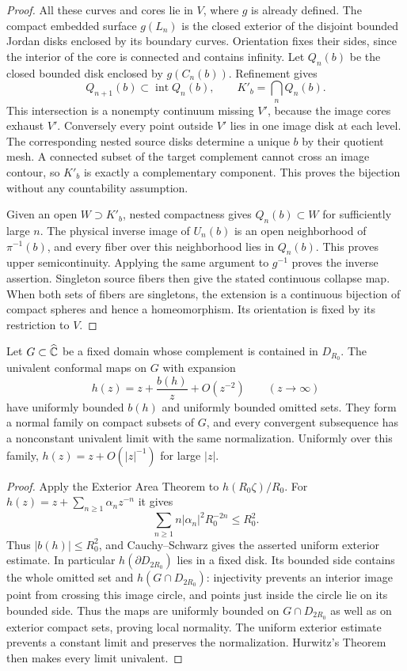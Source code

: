 \begin{proof}
All these curves and cores lie in $V$, where $g$ is already defined.
The compact embedded surface $g(L_n)$ is the closed exterior of the
disjoint bounded Jordan disks enclosed by its boundary curves.
Orientation fixes their sides, since the interior of the core is
connected and contains infinity.  Let $Q_n(b)$ be the closed bounded
disk enclosed by $g(C_n(b))$.  Refinement gives
\[
 Q_{n+1}(b)\subset\operatorname{int}Q_n(b),\qquad
 K'_b=\bigcap_nQ_n(b).
\]
This intersection is a nonempty continuum missing $V'$, because the
image cores exhaust $V'$.  Conversely every point outside $V'$ lies
in one image disk at each level.  The corresponding nested source
disks determine a unique $b$ by their quotient mesh.  A connected
subset of the target complement cannot cross an image contour, so
$K'_b$ is exactly a complementary component.  This proves the
bijection without any countability assumption.

Given an open $W\supset K'_b$, nested compactness gives
$Q_n(b)\subset W$ for sufficiently large $n$.  The physical inverse
image of $U_n(b)$ is an open neighborhood of $\pi^{-1}(b)$, and every
fiber over this neighborhood lies in $Q_n(b)$.  This proves upper
semicontinuity.  Applying the same argument to $g^{-1}$ proves the
inverse assertion.  Singleton source fibers then give the stated
continuous collapse map.  When both sets of fibers are singletons,
the extension is a continuous bijection of compact spheres and hence
a homeomorphism.  Its orientation is fixed by its restriction to $V$.
\end{proof}

\begin{lemma}\label{lem:normalization}
Let $G\subset\widehat{\mathbb C}$ be a fixed domain whose complement is contained
in $D_{R_0}$.  The univalent conformal maps on $G$ with expansion
\[
 h(z)=z+\frac{b(h)}z+O(z^{-2})\qquad(z\to\infty)
\]
have uniformly bounded $b(h)$ and uniformly bounded omitted sets.
They form a normal family on compact subsets of $G$, and every
convergent subsequence has a nonconstant univalent limit with the
same normalization.  Uniformly over this family,
$h(z)=z+O(|z|^{-1})$ for large $|z|$.
\end{lemma}

\begin{proof}
Apply the Exterior Area Theorem \cite{Ahlfors1973} to
$h(R_0\zeta)/R_0$.  For
$h(z)=z+\sum_{n\ge1}\alpha_nz^{-n}$ it gives
\[
 \sum_{n\ge1}n|\alpha_n|^2R_0^{-2n}\le R_0^2.
\]
Thus $|b(h)|\le R_0^2$, and Cauchy--Schwarz gives the asserted uniform
exterior estimate.  In particular $h(\partial D_{2R_0})$ lies in a
fixed disk.  Its bounded side contains the whole omitted set and
$h(G\cap D_{2R_0})$: injectivity prevents an interior image point
from crossing this image circle, and points just inside the circle
lie on its bounded side.  Thus the maps are uniformly bounded on
$G\cap D_{2R_0}$ as well as on exterior compact sets, proving
local normality.  The uniform exterior estimate prevents a
constant limit and preserves the normalization.  Hurwitz's Theorem
then makes every limit univalent.
\end{proof}

